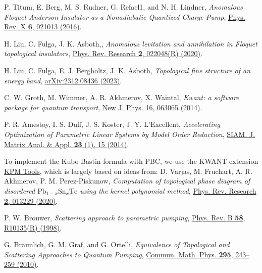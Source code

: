 \documentclass[aps,prb,amsmath,amssymb,twocolumn, superscriptaddress]{revtex4-2}
\begin{document}
\begin{thebibliography}{10}
P. Titum, E. Berg, M. S. Rudner, G. Refael1, and N. H. Lindner, {\em Anomalous Floquet-Anderson Insulator as a Nonadiabatic Quantized Charge Pump}, \href{https://journals.aps.org/prx/abstract/10.1103/PhysRevX.6.021013}{Phys. Rev. X {\bf 6}, 021013 (2016)}.

H. Liu, C. Fulga, J. K. Asboth,, {\em Anomalous levitation and annihilation in Floquet topological insulators}, \href{https://journals.aps.org/prresearch/abstract/10.1103/PhysRevResearch.2.022048}{Phys. Rev. Research {\bf 2}, 022048(R) (2020)}.

H. Liu, C. Fulga, E. J. Bergholtz, J. K. Asboth, {\em Topological fine structure of an energy band}, \href{https://arxiv.org/abs/2312.08436}{arXiv:2312.08436 (2023)}.

 C. W. Groth, M. Wimmer, A. R. Akhmerov, X. Waintal, {\em Kwant: a software package for quantum transport}, \href{https://iopscience.iop.org/article/10.1088/1367-2630/16/6/063065}{New J. Phys. 16, 063065 (2014)}.

P. R. Amestoy, I. S. Duff, J. S. Koster, J. Y. L’Excellent, {\em Accelerating Optimization of Parametric Linear Systems by Model Order Reduction}, \href{https://epubs.siam.org/doi/10.1137/120869171}{SIAM. J. Matrix Anal. \& Appl. {\bf 23} (1), 15 (2014)}. 

To implement the Kubo-Bastin formula with PBC, we use the KWANT extension \href{https://kpm-tools.readthedocs.io/en/latest/index.html}{KPM Tools}, which is largely based on ideas from: 
D. Varjas, M. Fruchart, A. R. Akhmerov, P. M. Perez-Piskunow, {\em Computation of topological phase diagram of disordered $\mathrm{Pb}_{1-x} \mathrm{Sn}_x \mathrm{Te}$ using the kernel polynomial method}, \href{https://journals.aps.org/prresearch/abstract/10.1103/PhysRevResearch.2.013229}{Phys. Rev. Research {\bf 2}, 013229 (2020)}. 

P. W. Brouwer, {\em Scattering approach to parametric pumping}, \href{https://journals.aps.org/prb/abstract/10.1103/PhysRevB.58.R10135}{Phys. Rev. B {\bfseries 58}, R10135(R) (1998)}.

G. Bräunlich, G. M. Graf, and G. Ortelli, {\em Equivalence of Topological and Scattering Approaches to Quantum Pumping}, \href{https://link.springer.com/article/10.1007/s00220-009-0983-1}{ Commun. Math. Phys. {\bfseries 295}, 243–259 (2010)}.


\end{thebibliography}
\end{document}
